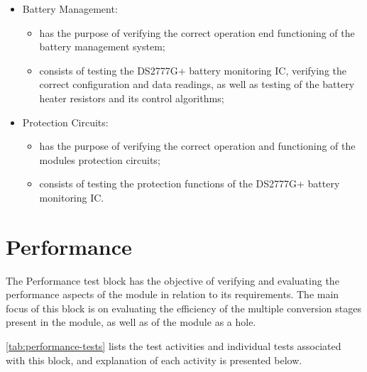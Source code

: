 \begin{itemize}
    \item Battery Management:
    \begin{itemize}
        \item has the purpose of verifying the correct operation end functioning of the battery management system;
        \item consists of testing the DS2777G+ battery monitoring IC, verifying the correct configuration and data readings, as well as testing of the battery heater resistors and its control algorithms;
    \end{itemize}

    \item Protection Circuits:
    \begin{itemize}
        \item has the purpose of verifying the correct operation and functioning of the modules protection circuits;
        \item consists of testing the protection functions of the DS2777G+ battery monitoring IC.
    \end{itemize}
\end{itemize}





\section{Performance}

The Performance test block has the objective of verifying and evaluating the performance aspects of the module in relation to its requirements.
The main focus of this block is on evaluating the efficiency of the multiple conversion stages present in the module, as well as of the module as a hole.

\autoref{tab:performance-tests} lists the test activities and individual tests associated with this block, and explanation of each activity is presented below.

